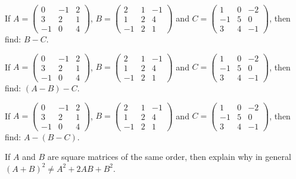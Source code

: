 \documentclass[11pt,a4paper]{article}
\begin{document}
\begin{shortlist}
\item If $A=\begin{pmatrix}0 & -1 & 2\\ 3 & 2 & 1\\ -1 & 0 & 4\end{pmatrix}$, $B=\begin{pmatrix}2 & 1 & -1\\ 1 & 2 & 4\\ -1 & 2 & 1\end{pmatrix}$ and $C=\begin{pmatrix}1 & 0 & -2\\ -1 & 5 & 0\\ 3 & 4 & -1\end{pmatrix}$, then find: $B-C$.

\item If $A=\begin{pmatrix}0 & -1 & 2\\ 3 & 2 & 1\\ -1 & 0 & 4\end{pmatrix}$, $B=\begin{pmatrix}2 & 1 & -1\\ 1 & 2 & 4\\ -1 & 2 & 1\end{pmatrix}$ and $C=\begin{pmatrix}1 & 0 & -2\\ -1 & 5 & 0\\ 3 & 4 & -1\end{pmatrix}$, then find: $(A-B)-C$.

\item If $A=\begin{pmatrix}0 & -1 & 2\\ 3 & 2 & 1\\ -1 & 0 & 4\end{pmatrix}$, $B=\begin{pmatrix}2 & 1 & -1\\ 1 & 2 & 4\\ -1 & 2 & 1\end{pmatrix}$ and $C=\begin{pmatrix}1 & 0 & -2\\ -1 & 5 & 0\\ 3 & 4 & -1\end{pmatrix}$, then find: $A-(B-C)$.

\item If $A$ and $B$ are square matrices of the same order, then explain why in general $(A+B)^2\neq A^2+2AB+B^2$.


\end{shortlist}
\end{document}
